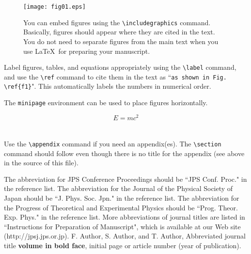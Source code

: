 \documentclass{jps-cp}
\begin{document}
\begin{figure}[tbh]
\texttt{[image: fig01.eps]}
\caption{You can embed figures using the \texttt{\textbackslash includegraphics} command. Basically, figures should appear where they are cited in the text. You do not need to separate figures from the main text when you use \LaTeX\ for preparing your manuscript.}
\label{f1}
\end{figure}

Label figures, tables, and equations appropriately using the \verb|\label| command, and use the \verb|\ref| command to cite them in the text as ``\verb|as shown in Fig. \ref{f1}|". This automatically labels the numbers in numerical order.

The \verb|minipage| environment can be used to place figures horizontally.

\begin{equation}
E = mc^{2}
\label{e1}
\end{equation}

\appendix
\section{}

Use the \verb|\appendix| command if you need an appendix(es). The \verb|\section| command should follow even though there is no title for the appendix (see above in the source of this file).


\begin{thebibliography}{9}
 The abbreviation for JPS Conference Proceedings should be ``JPS Conf. Proc." in the reference list.
 The abbreviation for the Journal of the Physical Society of Japan should be ``J. Phys. Soc. Jpn." in the reference list.
 The abbreviation for the Progress of Theoretical and Experimental Physics should be ``Prog. Theor. Exp. Phys." in the reference list.
 More abbreviations of journal titles are listed in ``Instructions for Preparation of Manuscript", which is available at our Web site (http://jpsj.jps.or.jp).
 F. Author, S. Author, and T. Author, Abbreviated journal title \textbf{volume in bold face}, initial page or article number (year of publication).
\end{thebibliography}
\end{document}
